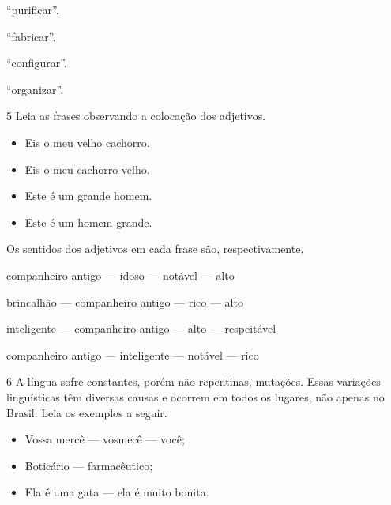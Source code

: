 \begin{escolha}
\item ``purificar''.

\item ``fabricar''.

\item ``configurar''.

\item ``organizar''.
\end{escolha}

\num{5} Leia as frases observando a colocação dos adjetivos.

\begin{myquote}
\begin{itemize}
\item Eis o meu velho cachorro.

\item Eis o meu cachorro velho.

\item Este é um grande homem.

\item Este é um homem grande.
\end{itemize}
\end{myquote}

Os sentidos dos adjetivos em cada frase são, respectivamente,

\begin{escolha}
\item companheiro antigo --- idoso --- notável --- alto

\item brincalhão --- companheiro antigo --- rico --- alto

\item inteligente --- companheiro antigo --- alto --- respeitável

\item companheiro antigo --- inteligente --- notável --- rico
\end{escolha}



\num{6} A língua sofre constantes, porém não repentinas, mutações. Essas
variações linguísticas têm diversas causas e ocorrem em todos os
lugares, não apenas no Brasil. Leia os exemplos a seguir.

\begin{myquote}
\begin{itemize}
\item Vossa mercê --- vosmecê --- você;

\item Boticário --- farmacêutico;

\item Ela é uma gata --- ela é muito bonita.
\end{itemize}
\end{myquote}


